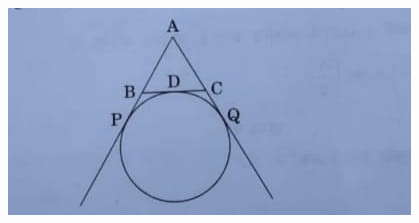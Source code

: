 \begin{enumerate}
\begin{figure}[H]
\centering
\includegraphics[width=\columnwidth]{figs/circ4.jpg}
\caption{}
\label{fig:circ4.jpg}
\end{figure}
\end{enumerate}